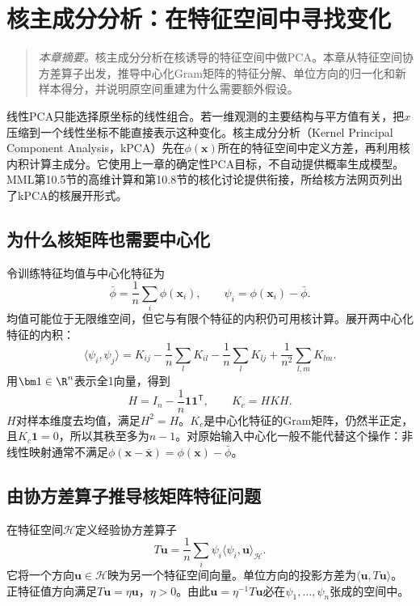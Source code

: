 \chapter{核主成分分析：在特征空间中寻找变化}
\label{chap:kpca}
\begin{quote}\small
\textit{本章摘要。}核主成分分析在核诱导的特征空间中做PCA。本章从特征空间协方差算子出发，推导中心化Gram矩阵的特征分解、单位方向的归一化和新样本得分，并说明原空间重建为什么需要额外假设。
\end{quote}

线性PCA只能选择原坐标的线性组合。若一维观测的主要结构与平方值有关，把$x$压缩到一个线性坐标不能直接表示这种变化。核主成分分析（Kernel Principal Component Analysis，kPCA）先在$\phi(\bm x)$所在的特征空间中定义方差，再利用核内积计算主成分\cite{scholkopf1998kpca}。它使用上一章的确定性PCA目标，不自动提供概率生成模型。MML第10.5节的高维计算和第10.8节的核化讨论提供衔接，所给核方法网页列出了kPCA的核展开形式\cite{deisenroth2020mml,zheng2021kernel}。

\section{为什么核矩阵也需要中心化}
令训练特征均值与中心化特征为
\begin{equation}
 \bar\phi=\frac1n\sum_i\phi(\bm x_i),\qquad
 \psi_i=\phi(\bm x_i)-\bar\phi.
\end{equation}
均值可能位于无限维空间，但它与有限个特征的内积仍可用核计算。展开两中心化特征的内积：
\begin{equation}
 \langle\psi_i,\psi_j\rangle
 =K_{ij}-\frac1n\sum_lK_{il}-\frac1n\sum_lK_{lj}
 +\frac1{n^2}\sum_{l,m}K_{lm}.
\end{equation}
用$\bm1\in\R^n$表示全1向量，得到
\begin{equation}
 H=I_n-\frac1n\bm1\bm1^{\mathsf T},\qquad K_c=HKH.
 \label{eq:kpca-centered-gram}
\end{equation}
$H$对样本维度去均值，满足$H^2=H$。$K_c$是中心化特征的Gram矩阵，仍然半正定，且$K_c\bm1=0$，所以其秩至多为$n-1$。对原始输入中心化一般不能代替这个操作：非线性映射通常不满足$\phi(\bm x-\bar{\bm x})=\phi(\bm x)-\bar\phi$。

\section{由协方差算子推导核矩阵特征问题}
在特征空间$\mathcal H$定义经验协方差算子
\begin{equation}
 T\bm u=\frac1n\sum_i\psi_i\langle\psi_i,\bm u\rangle_{\mathcal H}.
 \label{eq:kpca-covariance-operator}
\end{equation}
它将一个方向$\bm u\in\mathcal H$映为另一个特征空间向量。单位方向的投影方差为$\langle\bm u,T\bm u\rangle$。正特征值方向满足$T\bm u=\eta\bm u$，$\eta>0$。由此$\bm u=\eta^{-1}T\bm u$必在$\psi_1,\ldots,\psi_n$张成的空间中。

